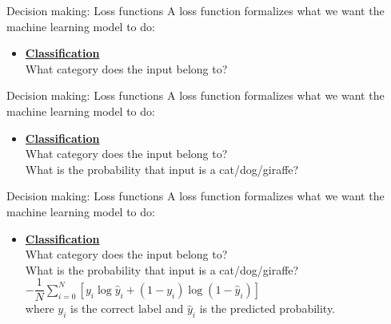 \documentclass[8pt]{beamer}
\begin{document}
	\begin{frame}[t]{Decision making: Loss functions} %
		\vspace{2cm}
		A loss function formalizes what we want the machine learning model to do:\\
		\begin{itemize}
			\item \textbf{\underline{Classification}}\\
			What category does the input belong to?\\
		\end{itemize}
	\end{frame}

	\begin{frame}[t]{Decision making: Loss functions} %
		\vspace{2cm}
		A loss function formalizes what we want the machine learning model to do:\\
		\begin{itemize}
			\item \textbf{\underline{Classification}}\\
			What category does the input belong to?\\
			\rightarrow \hspace{0.2cm} What is the probability that input is a cat/dog/giraffe?
		\end{itemize}
	\end{frame}

	\begin{frame}[t]{Decision making: Loss functions} %
		\vspace{2cm}
		A loss function formalizes what we want the machine learning model to do:\\
		\begin{itemize}
			\item \textbf{\underline{Classification}}\\
			What category does the input belong to?\\
			\rightarrow \hspace{0.2cm} What is the probability that input is a cat/dog/giraffe?\\
			\rightarrow \hspace{0.2cm} $-\dfrac{1}{N}\sum\limits_{i=0}^N \left[ y_i \log \hat{y}_i + (1 - y_i) \log (1 - \hat{y}_i) \right]$\\[0.2cm]
			where $y_i$ is the correct label and $\hat{y}_i$ is the predicted probability.
		\end{itemize}
	\end{frame}
\end{document}
